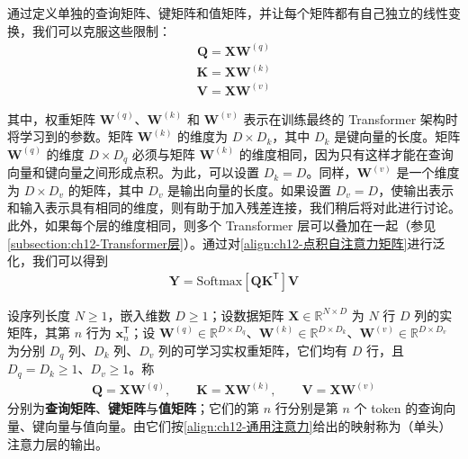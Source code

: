 \documentclass[../../main.tex]{subfiles}
\begin{document}
通过定义单独的查询矩阵、键矩阵和值矩阵，并让每个矩阵都有自己独立的线性变换，我们可以克服这些限制：
\begin{align}
\mathbf{Q}=\mathbf{X}\mathbf{W}^{(q)}
\label{align:ch12-查询矩阵}
\end{align}
\begin{align}
\mathbf{K}=\mathbf{X}\mathbf{W}^{(k)}
\label{align:ch12-键矩阵}
\end{align}
\begin{align}
\mathbf{V}=\mathbf{X}\mathbf{W}^{(v)}
\label{align:ch12-值矩阵}
\end{align}

其中，权重矩阵 $\mathbf{W}^{(q)}$、$\mathbf{W}^{(k)}$ 和 $\mathbf{W}^{(v)}$ 表示在训练最终的 Transformer 架构时将学习到的参数。矩阵 $\mathbf{W}^{(k)}$ 的维度为 $D\times D_k$，其中 $D_k$ 是键向量的长度。矩阵 $\mathbf{W}^{(q)}$ 的维度 $D\times D_q$ 必须与矩阵 $\mathbf{W}^{(k)}$ 的维度相同，因为只有这样才能在查询向量和键向量之间形成点积。为此，可以设置 $D_k=D$。同样，$\mathbf{W}^{(v)}$ 是一个维度为 $D\times D_v$ 的矩阵，其中 $D_v$ 是输出向量的长度。如果设置 $D_v=D$，使输出表示和输入表示具有相同的维度，则有助于加入残差连接，我们稍后将对此进行讨论。此外，如果每个层的维度相同，则多个 Transformer 层可以叠加在一起（参见\cref{subsection:ch12-Transformer层}）。通过对\eqref{align:ch12-点积自注意力矩阵}进行泛化，我们可以得到
\begin{align}
\mathbf{Y}=\mathrm{Softmax}\left[\mathbf{Q}\mathbf{K}^{\mathsf{T}}\right]\mathbf{V}
\label{align:ch12-通用注意力}
\end{align}

\begin{definition}[查询、键与值]\label{definition:ch12-查询键值}
设序列长度 $N\geqslant1$，嵌入维数 $D\geqslant1$；设数据矩阵 $\mathbf{X}\in\mathbb{R}^{N\times D}$ 为 $N$ 行 $D$ 列的实矩阵，其第 $n$ 行为 $\mathbf{x}_n^{\mathsf{T}}$；设 $\mathbf{W}^{(q)}\in\mathbb{R}^{D\times D_q}$、$\mathbf{W}^{(k)}\in\mathbb{R}^{D\times D_k}$、$\mathbf{W}^{(v)}\in\mathbb{R}^{D\times D_v}$ 为分别 $D_q$ 列、$D_k$ 列、$D_v$ 列的可学习实权重矩阵，它们均有 $D$ 行，且 $D_q=D_k\geqslant1$、$D_v\geqslant1$。称
\begin{align}
\mathbf{Q}=\mathbf{X}\mathbf{W}^{(q)},\qquad
\mathbf{K}=\mathbf{X}\mathbf{W}^{(k)},\qquad
\mathbf{V}=\mathbf{X}\mathbf{W}^{(v)}
\label{align:ch12-查询键值定义}
\end{align}
分别为\textbf{查询矩阵}、\textbf{键矩阵}与\textbf{值矩阵}；它们的第 $n$ 行分别是第 $n$ 个 token 的查询向量、键向量与值向量。由它们按\eqref{align:ch12-通用注意力}给出的映射称为（单头）注意力层的输出。
\end{definition}
\end{document}
